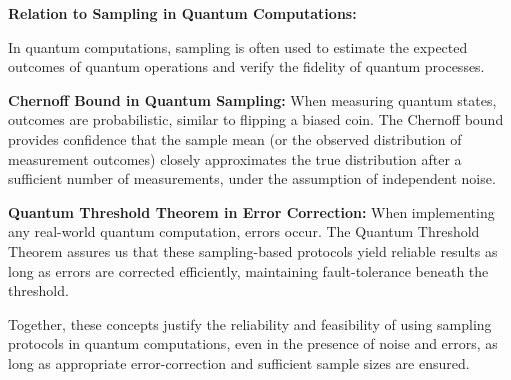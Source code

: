 \begin{airesult}
\textbf{Relation to Sampling in Quantum Computations:}

In quantum computations, sampling is often used to estimate the expected
outcomes of quantum operations and verify the fidelity of quantum processes.

\ls \textbf{Chernoff Bound in Quantum Sampling:} When measuring quantum states,
outcomes are probabilistic, similar to flipping a biased coin. The Chernoff
bound provides confidence that the sample mean (or the observed distribution of
measurement outcomes) closely approximates the true distribution after a
sufficient number of measurements, under the assumption of independent noise.

\li \textbf{Quantum Threshold Theorem in Error Correction:} When implementing any
real-world quantum computation, errors occur. The Quantum Threshold Theorem
assures us that these sampling-based protocols yield reliable results as long as
errors are corrected efficiently, maintaining fault-tolerance beneath the
threshold.
\le

Together, these concepts justify the reliability and feasibility of using
sampling protocols in quantum computations, even in the presence of noise and
errors, as long as appropriate error-correction and sufficient sample sizes are
ensured.
\end{airesult}
